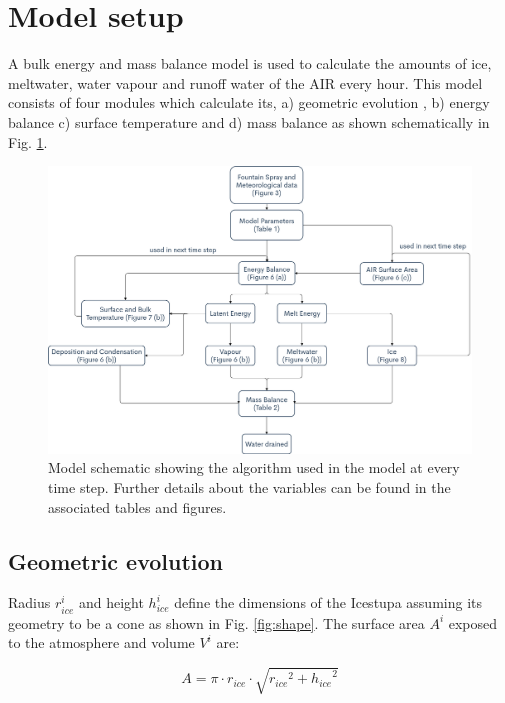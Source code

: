 \documentclass[utf8]{frontiersSCNS} %
\begin{document}
\section{Model setup}

A bulk energy and mass balance model is used to calculate the amounts of ice, meltwater, water vapour and runoff water
of the AIR every hour. This model consists of four modules which calculate its, a) geometric evolution , b) energy
balance c) surface temperature and d) mass balance as shown schematically in Fig. \ref{fig:schema}. 

  \begin{figure} \begin{center} \includegraphics[width=15 cm]{Figures/Figure_4.jpg} \end{center} \caption{Model
schematic showing the algorithm used in the model at every time step. Further details about the variables can be
found in the associated tables and figures.} \label{fig:schema} \end{figure}

\subsection{Geometric evolution}

Radius $r_{ice}^i$ and height $h_{ice}^i$ define the dimensions of the Icestupa assuming its geometry to be a cone as
shown in Fig. \ref{fig:shape}. The surface area $A^i$ exposed to the atmosphere and volume $V^i$ are:

\begin{equation} A = \pi \cdot r_{ice} \cdot \sqrt{{r_{ice}}^2 + {h_{ice}}^ 2} \label{eqn:A} \end{equation}
\end{document}

